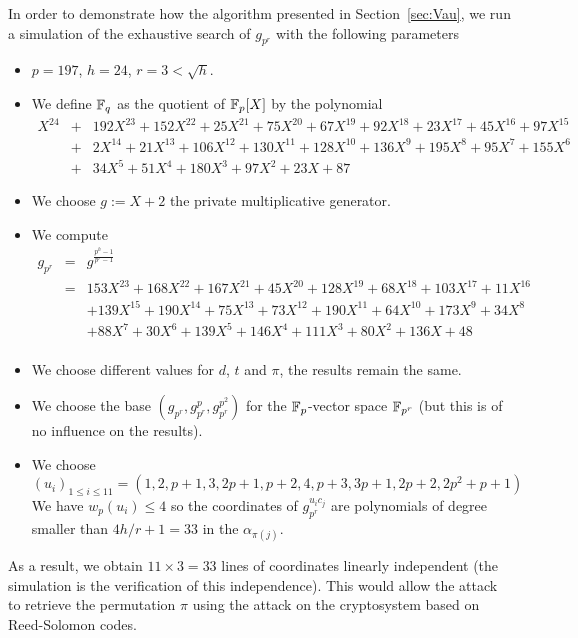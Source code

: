 \documentclass[12pt,a4paper,titlepage]{article}
\begin{document}
In order to demonstrate how the algorithm presented in Section~\ref{sec:Vau}, we run a simulation of the exhaustive search of $g_{p^r}$ with the following parameters
\begin{itemize}
\item $p = 197$, $h = 24$, $r = 3 < \sqrt{h}$.
\item We define $\mathbb{F}_q$ as the quotient of $\mathbb{F}_p[X]$ by the polynomial
\begin{eqnarray*}
X^{24} &+& 192X^{23} + 152X^{22} + 25X^{21} + 75X^{20} + 67X^{19} + 92X^{18} + 23X^{17} + 45X^{16} + 97X^{15} \\
 &+& 2X^{14} + 21X^{13} + 106X^{12} + 130X^{11} + 128X^{10} + 136X^9 + 195X^8 + 95X^7 + 155X^6 \\
 &+& 34X^5 + 51X^4 + 180X^3 + 97X^2 + 23X + 87
\end{eqnarray*}
\item We choose $g := X + 2$ the private multiplicative generator.
\item We compute
\begin{eqnarray*}
g_{p^r} &=& g^{\frac{p^h-1}{p^r-1}} \\
&=& 153X^{23} + 168X^{22} + 167X^{21} + 45X^{20} + 128X^{19} + 68X^{18} + 103X^{17} + 11X^{16}\\
&&+ 139X^{15} + 190X^{14} + 75X^{13} + 73X^{12} + 190X^{11} + 64X^{10} + 173X^9 + 34X^8 \\
&&+ 88X^7 + 30X^6 + 139X^5 + 146X^4 + 111X^3 + 80X^2 + 136X + 48\\
\end{eqnarray*}
\item We choose different values for $d$, $t$ and $\pi$, the results remain the same.
\item We choose the base $\left(g_{p^r}, g_{p^r}^p, g_{p^r}^{p^2} \right)$ for the $\mathbb{F}_p$-vector space $\mathbb{F}_{p^r}$ (but this is of no influence on the results).
\item We choose $(u_i)_{1\leq  i \leq 11} = (1,2,p+1,3,2p+1,p+2,4,p+3,3p+1,2p+2,2p^2+p+1)$\\
We have $w_p(u_i) \leq 4$ so the coordinates of $g_{p^r}^{u_i c_j}$ are polynomials of degree smaller than $4 h/r+1 = 33$ in the $\alpha_{\pi(j)}$.
\end{itemize}
As a result, we obtain $11 \times 3 = 33$ lines of coordinates linearly independent (the simulation is the verification of this independence). This would allow the attack to retrieve the permutation $\pi$ using the attack on the cryptosystem based on Reed-Solomon codes.
\end{document}
